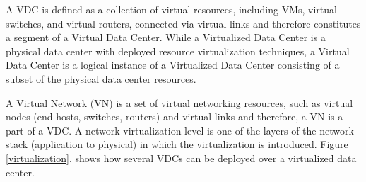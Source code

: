 A VDC is defined as a collection of virtual resources, including VMs, virtual switches, and virtual routers, connected via virtual links and therefore constitutes a segment of a Virtual Data Center. While a Virtualized Data Center is a physical data center with deployed resource virtualization techniques, a Virtual Data Center is a logical instance of a Virtualized Data Center consisting of a subset of the physical data center resources. 

A Virtual Network (VN) is a set of virtual networking resources, such as virtual nodes (end-hosts, switches, routers) and virtual links and therefore, a VN is a part of a VDC. A network virtualization level is one of the layers of the network stack (application to physical) in which the virtualization is introduced. Figure \ref{virtualization}, shows how several VDCs can be deployed over a virtualized data center. 
